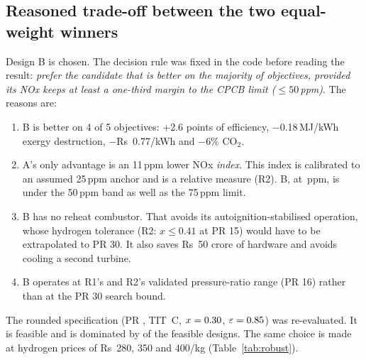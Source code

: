 \documentclass[10.5pt,a4paper]{article}
\newcommand{\Rs}{Rs~}
\begin{document}
\subsection{Reasoned trade-off between the two equal-weight winners}
\begin{table}[H]\centering\small\caption{Head-to-head of the two equal-weight TOPSIS winners.}\label{tab:h2h}

\end{table}
Design B is chosen. The decision rule was fixed in the code before reading the result: \emph{prefer the candidate that is better on the majority of objectives, provided its NOx keeps at least a one-third margin to the CPCB limit ($\le50$\,ppm)}. The reasons are:
\begin{enumerate}[leftmargin=1.4em,itemsep=1pt]
\item B is better on 4 of 5 objectives: +2.6 points of efficiency, $-$0.18\,MJ/kWh exergy destruction, $-$\Rs0.77/kWh and $-$6\% CO$_2$.
\item A's only advantage is an 11\,ppm lower NOx \emph{index}. This index is calibrated to an assumed 25\,ppm anchor and is a relative measure (R2). B, at \finNOx\,ppm, is under the 50\,ppm band as well as the 75\,ppm limit.
\item B has no reheat combustor. That avoids its autoignition-stabilised operation, whose hydrogen tolerance (R2: $x\le0.41$ at PR 15) would have to be extrapolated to PR 30. It also saves \Rs50 crore of hardware and avoids cooling a second turbine.
\item B operates at R1's and R2's validated pressure-ratio range (PR 16) rather than at the PR 30 search bound.
\end{enumerate}
The rounded specification (PR \finPR, TIT \finTITC\,\textdegree C, $x=0.30$, $\varepsilon=0.85$) was re-evaluated. It is feasible and is dominated by \nDom{} of the \nFeas{} feasible designs. The same choice is made at hydrogen prices of \Rs280, 350 and 400/kg (Table~\ref{tab:robust}).

\end{document}
